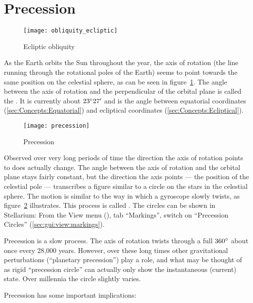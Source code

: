 \section{Precession}
\label{sec:Concepts:Precession}

\begin{figure}[htb]
\centering\texttt{[image: obliquity\_ecliptic]}
\caption{Ecliptic obliquity}
\label{fig:Obliquity}
\end{figure}

As the Earth orbits the Sun throughout the year, the axis of rotation
(the line running through the rotational poles of the Earth) seems to
point towards the same position on the celestial sphere, as can be
seen in figure~\ref{fig:Obliquity}. The angle between the axis of
rotation and the perpendicular of the orbital plane is called the
. It is currently about
$23\degree27'$ and is the angle between equatorial coordinates
(\ref{sec:Concepts:Equatorial}) and ecliptical coordinates
(\ref{sec:Concepts:Ecliptical}).

\begin{figure}[htb]
\centering\texttt{[image: precession]}
\caption{Precession}
\label{fig:Precession}
\end{figure}





Observed over very long periods of time the direction the axis of
rotation points to does actually change. The angle between the axis of
rotation and the orbital plane stays fairly constant, but the
direction the axis points --- the position of the celestial pole ---
transcribes a figure similar to a circle on the stars in the celestial sphere. The motion
is similar to the way in which a gyroscope slowly twists, as
figure~\ref{fig:Precession} illustrates. This process is called
. The circles can be shown in Stellarium: From
the View menu (), tab ``Markings'', switch on ``Precession
Circles'' (\ref{sec:gui:view:markings}).

Precession is a slow process. The axis of rotation twists through a
full $360\degree$ about once every 28,000 years. However, over these
long times other gravitational perturbations (``planetary
precession'') play a role, and what may be thought of as rigid
``precession circle'' can actually only show the instantaneous
(current) state. Over millennia the circle slightly varies.

Precession has some important implications:

